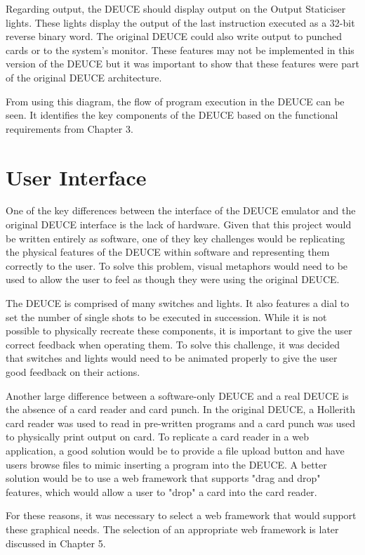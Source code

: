 \documentclass{l4proj}
\begin{document}
Regarding output, the DEUCE should display output on the Output Staticiser lights. These lights display the output of the last instruction executed as a 32-bit reverse binary word. The original DEUCE could also write output to punched cards or to the system's monitor. These features may not be implemented in this version of the DEUCE but it was important to show that these features were part of the original DEUCE architecture.

From using this diagram, the flow of program execution in the DEUCE can be seen. It identifies the key components of the DEUCE based on the functional requirements from Chapter 3.
	
\section{User Interface}
One of the key differences between the interface of the DEUCE emulator and the original DEUCE interface is the lack of hardware. Given that this project would be written entirely as software, one of they key challenges would be replicating the physical features of the DEUCE within software and representing them correctly to the user. To solve this problem, visual metaphors would need to be used to allow the user to feel as though they were using the original DEUCE.
	
The DEUCE is comprised of many switches and lights. It also features a dial to set the number of single shots to be executed in succession. While it is not possible to physically recreate these components, it is important to give the user correct feedback when operating them. To solve this challenge, it was decided that switches and lights would need to be animated properly to give the user good feedback on their actions.
	
Another large difference between a software-only DEUCE and a real DEUCE is the absence of a card reader and card punch. In the original DEUCE, a Hollerith card reader was used to read in pre-written programs and a card punch was used to physically print output on card. To replicate a card reader in a web application, a good solution would be to provide a file upload button and have users browse files to mimic inserting a program into the DEUCE. A better solution would be to use a web framework that supports "drag and drop" features, which would allow a user to "drop" a card into the card reader. 
	
For these reasons, it was necessary to select a web framework that would support these graphical needs. The selection of an appropriate web framework is later discussed in Chapter 5.
\end{document}
